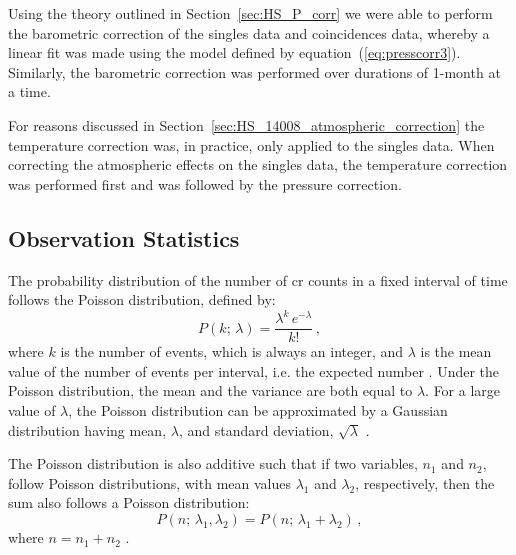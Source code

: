 Using the theory outlined in Section~\ref{sec:HS_P_corr} we were able to perform the barometric correction of the singles data and coincidences data, whereby a linear fit was made using the model defined by equation~(\ref{eq:presscorr3}). Similarly, the barometric correction was performed over durations of 1-month at a time.

For reasons discussed in Section~\ref{sec:HS_14008_atmospheric_correction} the temperature correction was, in practice, only applied to the singles data. When correcting the atmospheric effects on the singles data, the temperature correction was performed first and was followed by the pressure correction.



\subsection{Observation Statistics}\label{sec:HS_14008_method_obs}

The probability distribution of the number of \gls{cr} counts in a fixed interval of time follows the Poisson distribution, defined by:
%
\begin{equation}
P(k; \, \lambda) = \frac{\lambda^k \, e^{-\lambda}}{k!} \, ,
\label{eq:poisson_PDF}
\end{equation}
%
where $k$ is the number of events, which is always an integer, and $\lambda$ is the mean value of the number of events per interval, i.e. the expected number \citep{lista_statistical_2016}. Under the Poisson distribution, the mean and the variance are both equal to $\lambda$. For a large value of $\lambda$, the Poisson distribution can be approximated by a Gaussian distribution having mean, $\lambda$, and standard deviation, $\sqrt{\lambda}$ \citep{lista_statistical_2016}.

The Poisson distribution is also additive such that if two variables, $n_1$ and $n_2$, follow Poisson distributions, with mean values $\lambda_1$ and $\lambda_2$, respectively, then the sum also follows a Poisson distribution:
%
\begin{equation}
P(n; \, \lambda_1, \lambda_2) = P(n; \, \lambda_1 + \lambda_2) \, ,
\label{eq:poisson_additive_PDF}
\end{equation}
%
where $n = n_1 + n_2$ \citep{lista_statistical_2016}.

